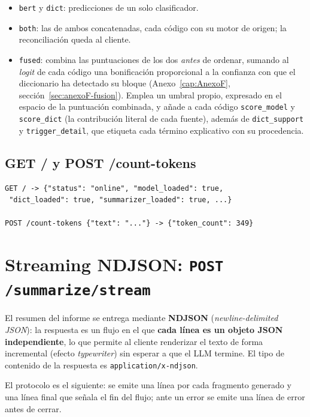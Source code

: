 \begin{itemize}
 \item \texttt{bert} y \texttt{dict}: predicciones de un solo clasificador.
 \item \texttt{both}: las de ambos concatenadas, cada código con su motor de origen; la reconciliación queda al cliente.
 \item \texttt{fused}: combina las puntuaciones de los dos \emph{antes} de ordenar, sumando al \emph{logit} de cada código una bonificación proporcional a la confianza con que el diccionario ha detectado su bloque (Anexo~\ref{cap:AnexoF}, sección~\ref{sec:anexoF-fusion}). Emplea un umbral propio, expresado en el espacio de la puntuación combinada, y añade a cada código \texttt{score\_model} y \texttt{score\_dict} (la contribución literal de cada fuente), además de \texttt{dict\_support} y \texttt{trigger\_detail}, que etiqueta cada término explicativo con su procedencia.
\end{itemize}

\subsection{GET / y POST /count-tokens}\label{sec:m-estado}

{\small
\begin{verbatim}
GET / -> {"status": "online", "model_loaded": true,
 "dict_loaded": true, "summarizer_loaded": true, ...}

POST /count-tokens {"text": "..."} -> {"token_count": 349}
\end{verbatim}
}

\section{Streaming NDJSON: \texttt{POST /summarize/stream}}

El resumen del informe se entrega mediante \textbf{NDJSON} (\emph{newline-delimited JSON}): la respuesta es un flujo en el que \textbf{cada línea es un objeto JSON independiente}, lo que permite al cliente renderizar el texto de forma incremental (efecto \emph{typewriter}) sin esperar a que el LLM termine. El tipo de contenido de la respuesta es \texttt{application/x-ndjson}.

El protocolo es el siguiente: se emite una línea por cada fragmento generado y una línea final que señala el fin del flujo; ante un error se emite una línea de error antes de cerrar.

